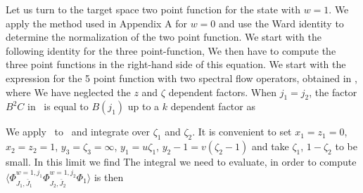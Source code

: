 Let us turn to the target space two point function
for the state with $w=1$. We apply the method used
in Appendix A for $w=0$ and use the Ward identity
to determine the normalization of the two point function.
We start with the following identity for the three point-function,
\eqn{}
We then have to compute the
three point functions in the right-hand side of this equation.
We start with the expression for the 5 point function with
two spectral flow operators, obtained in \zam ,
\eqn{}
where
\eqn{}
We have neglected the  $z$ and $\zeta$ dependent
factors.
When $j_1=j_2$, the factor $B^2 C$ in \zamformula\ is equal to
$B(j_1)$ up to a $k$ dependent factor as
\eqn\fateofc{
C\left( {k\over 2} - j, {k\over 2} - j, 1\right)
= {G(2j-k) \over 2\pi^2 \nu^{k-2j} \gamma\left(
{k-1 \over k-2}\right) G(1+2j-k)}
= \left({k-2 \over 2\pi}\right)^2 \nu^{2-k} {1 \over B(j)}
.}

We apply \ to \zamformula\ and integrate
over $\zeta_1$ and $\zeta_2$. It is convenient to
set $x_1=z_1=0$, $x_2=z_2=1$, $y_3=\zeta_3=\infty$,
$y_1=u \zeta_1$, $y_2-1 = v(\zeta_2-1)$ and take
$\zeta_1$, $1-\zeta_2$ to be small. In this limit we find
\eqn{}
The integral we need to evaluate, in order to compute
$\langle \Phi_{J_1,\bar{J}_1}^{w=1,j_1}
\Phi_{J_2,\bar J_2}^{w=1,j_2} \Phi_1 \rangle$ is then
\eqn{}



